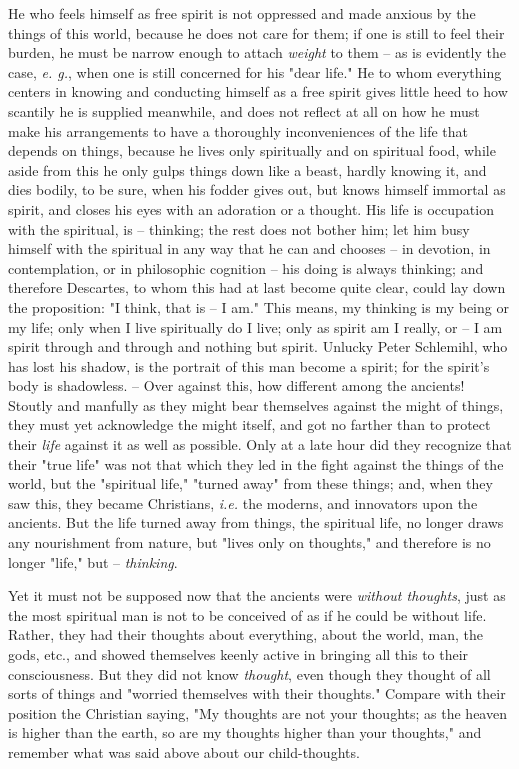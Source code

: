 He who feels himself as free spirit is not oppressed and made anxious by the 
things of this world, because he does not care for them; if one is still to 
feel their burden, he must be narrow enough to attach \textit{weight} to them 
-- as is evidently the case, \textit{e. g.}, when one is still concerned for 
his "{}dear life."{} He to whom everything centers in knowing and conducting 
himself as a free spirit gives little heed to how scantily he is supplied 
meanwhile, and does not reflect at all on how he must make his arrangements to 
have a thoroughly inconveniences of the life that depends on things, because 
he lives only spiritually and on spiritual food, while aside from this he only 
gulps things down like a beast, hardly knowing it, and dies bodily, to be 
sure, when his fodder gives out, but knows himself immortal as spirit, and 
closes his eyes with an adoration or a thought. His life is occupation with 
the spiritual, is -- thinking; the rest does not bother him; let him busy 
himself with the spiritual in any way that he can and chooses -- in devotion, 
in contemplation, or in philosophic cognition -- his doing is always thinking; 
and therefore Descartes, to whom this had at last become quite clear, could 
lay down the proposition: "{}I think, that is -- I am."{} This means, my 
thinking is my being or my life; only when I live spiritually do I live; only 
as spirit am I really, or -- I am spirit through and through and nothing but 
spirit. Unlucky Peter Schlemihl, who has lost his shadow, is the portrait of 
this man become a spirit; for the spirit's body is shadowless. -- Over against 
this, how different among the ancients! Stoutly and manfully as they might 
bear themselves against the might of things, they must yet acknowledge the 
might itself, and got no farther than to protect their \textit{life} against 
it as well as possible. Only at a late hour did they recognize that their 
"{}true life"{} was not that which they led in the fight against the things of 
the world, but the "{}spiritual life,"{} "{}turned away"{} from these things; 
and, when they saw this, they became Christians, \textit{i.e.} the moderns, 
and innovators upon the ancients. But the life turned away from things, the 
spiritual life, no longer draws any nourishment from nature, but "{}lives only 
on thoughts,"{} and therefore is no longer "{}life,"{} but -- 
\textit{thinking}.

Yet it must not be supposed now that the ancients were \textit{without 
thoughts}, just as the most spiritual man is not to be conceived of as if he 
could be without life. Rather, they had their thoughts about everything, about 
the world, man, the gods, etc., and showed themselves keenly active in 
bringing all this to their consciousness. But they did not know 
\textit{thought}, even though they thought of all sorts of things and 
"{}worried themselves with their thoughts."{} Compare with their position the 
Christian saying, "{}My thoughts are not your thoughts; as the heaven is 
higher than the earth, so are my thoughts higher than your thoughts,"{} and 
remember what was said above about our child-thoughts.

